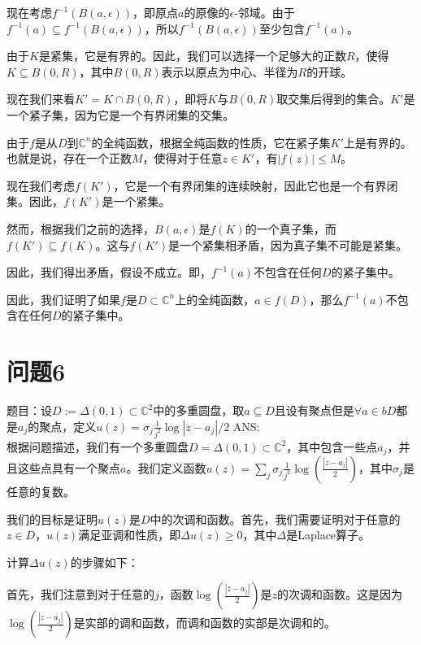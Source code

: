 \documentclass[12pt, a4paper, oneside]{ctexart}
\begin{document}
\begin{spacing}{2.0}
现在考虑$f^{-1}(B(a,\epsilon))$，即原点$a$的原像的$\epsilon$-邻域。由于$\displaystyle f^{-1}(a)\subseteq f^{-1}(B(a,\epsilon))$，所以$f^{-1}(B(a,\epsilon))$至少包含$f^{-1}(a)$。

由于$K$是紧集，它是有界的。因此，我们可以选择一个足够大的正数$R$，使得$K\subseteq B(0,R)$，其中$B(0,R)$表示以原点为中心、半径为$R$的开球。

现在我们来看$K' = K \cap B(0,R)$，即将$K$与$B(0,R)$取交集后得到的集合。$K'$是一个紧子集，因为它是一个有界闭集的交集。

由于$f$是从$D$到$\mathbb{C}^n$的全纯函数，根据全纯函数的性质，它在紧子集$K'$上是有界的。也就是说，存在一个正数$M$，使得对于任意$z\in K'$，有$|f(z)|\leq M$。

现在我们考虑$f(K')$，它是一个有界闭集的连续映射，因此它也是一个有界闭集。因此，$f(K')$是一个紧集。

然而，根据我们之前的选择，$\displaystyle B(a,\epsilon)$是$f(K)$的一个真子集，而$f(K')\subseteq f(K)$。这与$f(K')$是一个紧集相矛盾，因为真子集不可能是紧集。

因此，我们得出矛盾，假设不成立。即，$\displaystyle f^{-1}(a)$不包含在任何$D$的紧子集中。

因此，我们证明了如果$f$是$\displaystyle D\subset \mathbb{C}^n$上的全纯函数，$a\in f(D)$，那么$f^{-1}(a)$不包含在任何$D$的紧子集中。
\section{问题6}
题目：设$\displaystyle D := \Delta(0, 1) \subset \mathbb{C} ^2$中的多重圆盘，取${a}\subseteq D$且设有聚点但是$\forall a\in bD$都是${a_j}$的聚点，定义$\displaystyle u(z) = \sigma_j \frac{1}{j^2}\log{|z-a_j|/2}$
ANS:\\
根据问题描述，我们有一个多重圆盘$\displaystyle D = \Delta(0, 1) \subset \mathbb{C}^2$，其中包含一些点$a_j$，并且这些点具有一个聚点$a$。我们定义函数$\displaystyle u(z) = \sum_{j}\sigma_j \frac{1}{j^2}\log\left(\frac{|z-a_j|}{2}\right)$，其中$\sigma_j$是任意的复数。

我们的目标是证明$u(z)$是$D$中的次调和函数。首先，我们需要证明对于任意的$z\in D$，$u(z)$满足亚调和性质，即$\Delta u(z) \geq 0$，其中$\Delta$是Laplace算子。

计算$\Delta u(z)$的步骤如下：

首先，我们注意到对于任意的$j$，函数$\displaystyle \log\left(\frac{|z-a_j|}{2}\right)$是$z$的次调和函数。这是因为$\displaystyle \log\left(\frac{|z-a_j|}{2}\right)$是实部的调和函数，而调和函数的实部是次调和的。


\end{spacing}
\end{document}
